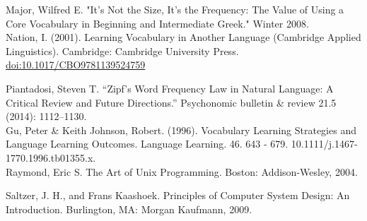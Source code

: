 \documentclass[11pt]{article}
\begin{document}
Major, Wilfred E. "It’s Not the Size, It’s the Frequency: The Value of Using a Core Vocabulary in Beginning and Intermediate Greek." Winter 2008. \\

Nation, I. (2001). Learning Vocabulary in Another Language (Cambridge Applied Linguistics). Cambridge: Cambridge University Press. \url{doi:10.1017/CBO9781139524759}

Piantadosi, Steven T. “Zipf’s Word Frequency Law in Natural Language: A Critical Review and Future Directions.” Psychonomic bulletin \& review 21.5 (2014): 1112–1130. \\

Gu, Peter \& Keith Johnson, Robert. (1996). Vocabulary Learning Strategies and Language Learning Outcomes. Language Learning. 46. 643 - 679. 10.1111/j.1467-1770.1996.tb01355.x. \\

Raymond, Eric S. The Art of Unix Programming. Boston: Addison-Wesley, 2004.

Saltzer, J. H., and Frans Kaashoek. Principles of Computer System Design: An Introduction. Burlington, MA: Morgan Kaufmann, 2009. 
\end{document}
